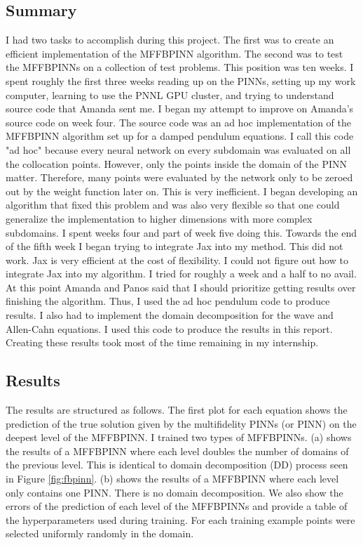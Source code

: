 \documentclass[12pt]{article}
\begin{document}
\subsection{Summary}
I had two tasks to accomplish during this project. The first was to create an efficient implementation of the MFFBPINN algorithm. The second was to test the MFFBPINNs on a collection of test problems. This position was ten weeks. I spent roughly the first three weeks reading up on the PINNs, setting up my work computer, learning to use the PNNL GPU cluster, and trying to understand source code that Amanda sent me. I began my attempt to improve on Amanda's source code on week four. The source code was an ad hoc implementation of the MFFBPINN algorithm set up for a damped pendulum equations. I call this code "ad hoc" because every neural network on every subdomain was evaluated on all the collocation points. However, only the points inside the domain of the PINN matter. Therefore, many points were evaluated by the network only to be zeroed out by the weight function later on. This is very inefficient. I began developing an algorithm that fixed this problem and was also very flexible so that one could generalize the implementation to higher dimensions with more complex subdomains. I spent weeks four and part of week five doing this. Towards the end of the fifth week I began trying to integrate Jax into my method. This did not work. Jax is very efficient at the cost of flexibility. I could not figure out how to integrate Jax into my algorithm. I tried for roughly a week and a half to no avail. At this point Amanda and Panos said that I should prioritize getting results over finishing the algorithm. Thus, I used the ad hoc pendulum code to produce results.  I also had to implement the domain decomposition for the wave and Allen-Cahn equations. I used this code to produce the results in this report. Creating these results took most of the time remaining in my internship.
\subsection{Results}
The results are structured as follows. The first plot for each equation shows the prediction of the true solution given by the multifidelity PINNs (or PINN) on the deepest level of the MFFBPINN. I trained two types of MFFBPINNs. (a) shows the results of a MFFBPINN where each level doubles the number of domains of the previous level. This is identical to domain decomposition (DD) process seen in Figure \ref{fig:fbpinn}. (b) shows the results of a MFFBPINN where each level only contains one PINN. There is no domain decomposition. We also show the errors of the prediction of each level of the MFFBPINNs and provide a table of the hyperparameters used during training. For each training example points were selected uniformly randomly in the domain.
\end{document}
